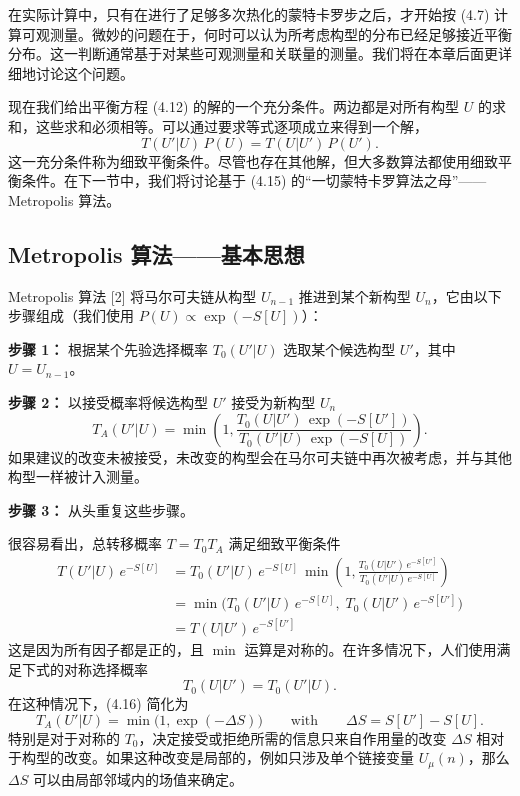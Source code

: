 在实际计算中，只有在进行了足够多次热化的蒙特卡罗步之后，才开始按 (4.7) 计算可观测量。微妙的问题在于，何时可以认为所考虑构型的分布已经足够接近平衡分布。这一判断通常基于对某些可观测量和关联量的测量。我们将在本章后面更详细地讨论这个问题。

现在我们给出平衡方程 (4.12) 的解的一个充分条件。两边都是对所有构型 $U$ 的求和，这些求和必须相等。可以通过要求等式逐项成立来得到一个解，
\begin{equation}
  T(U'|U)\,P(U) = T(U|U')\,P(U').
\end{equation}
这一充分条件称为细致平衡条件。尽管也存在其他解，但大多数算法都使用细致平衡条件。在下一节中，我们将讨论基于 (4.15) 的“一切蒙特卡罗算法之母”——Metropolis 算法。

\subsection{Metropolis 算法——基本思想}

Metropolis 算法 [2] 将马尔可夫链从构型 $U_{n-1}$ 推进到某个新构型 $U_n$，它由以下步骤组成（我们使用 $P(U) \propto \exp(-S[U])$）：

\textbf{步骤 1：} 根据某个先验选择概率 $T_0(U'|U)$ 选取某个候选构型 $U'$，其中 $U = U_{n-1}$。

\textbf{步骤 2：} 以接受概率将候选构型 $U'$ 接受为新构型 $U_n$
\begin{equation}
  T_A(U'|U) = \min\!\left(1, \frac{T_0(U|U')\,\exp(-S[U'])}{T_0(U'|U)\,\exp(-S[U])}\right).
\end{equation}
如果建议的改变未被接受，未改变的构型会在马尔可夫链中再次被考虑，并与其他构型一样被计入测量。

\textbf{步骤 3：} 从头重复这些步骤。

很容易看出，总转移概率 $T = T_0 T_A$ 满足细致平衡条件
\begin{equation}
  \begin{split}
    T(U'|U)\,e^{-S[U]}
    &= T_0(U'|U)\,e^{-S[U]}\,
       \min\!\left(1, \frac{T_0(U|U')\,e^{-S[U']}}{T_0(U'|U)\,e^{-S[U]}}\right) \\
    &= \min\!\big(T_0(U'|U)\,e^{-S[U]},\; T_0(U|U')\,e^{-S[U']}\big) \\
    &= T(U|U')\,e^{-S[U']}
  \end{split}
\end{equation}
这是因为所有因子都是正的，且 $\min$ 运算是对称的。在许多情况下，人们使用满足下式的对称选择概率
\begin{equation}
  T_0(U|U') = T_0(U'|U).
\end{equation}
在这种情况下，(4.16) 简化为
\begin{equation}
  T_A(U'|U) = \min\!\big(1, \exp(-\Delta S)\big)
  \qquad\text{with}\qquad
  \Delta S = S[U'] - S[U].
\end{equation}
特别是对于对称的 $T_0$，决定接受或拒绝所需的信息只来自作用量的改变 $\Delta S$ 相对于构型的改变。如果这种改变是局部的，例如只涉及单个链接变量 $U_\mu(n)$，那么 $\Delta S$ 可以由局部邻域内的场值来确定。

